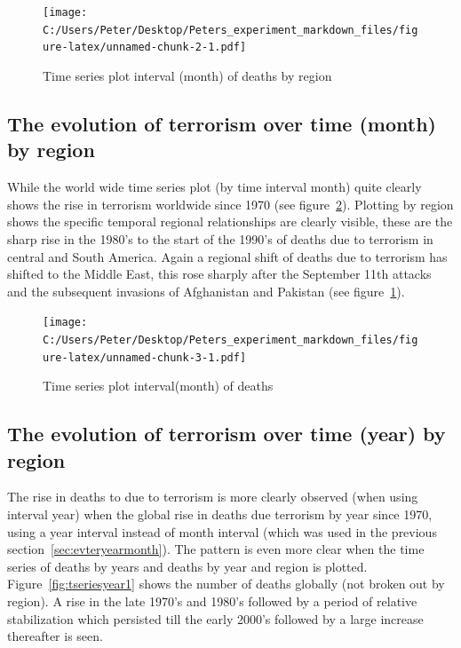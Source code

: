 \begin{figure}[t]
\texttt{[image: C:/Users/Peter/Desktop/Peters\_experiment\_markdown\_files/figure-latex/unnamed-chunk-2-1.pdf]}
\caption{Time series plot interval (month) of deaths by region}
\label{fig:tseriesmonthregion1}
\centering
\end{figure}

\subsection{The evolution of terrorism over time (month) by
region}

While the world wide time series plot (by time interval month) quite clearly shows the rise in terrorism worldwide since 1970 (see figure~\ref{fig:tseriesmonth1}). Plotting by region shows the specific temporal regional relationships are clearly visible, these are the sharp rise in the 1980's to the start of the 1990's of deaths due to terrorism in central and South America. Again a regional shift of deaths due to terrorism has shifted to the Middle East, this rose sharply after the September 11th attacks and the subsequent invasions of Afghanistan and Pakistan (see figure~\ref{fig:tseriesmonthregion1}).

\begin{figure}[t]
\texttt{[image: C:/Users/Peter/Desktop/Peters\_experiment\_markdown\_files/figure-latex/unnamed-chunk-3-1.pdf]}
\caption{Time series plot interval(month) of deaths}
\label{fig:tseriesmonth1}
\centering
\end{figure}

\subsection{The evolution of terrorism over time (year) by
region}

The rise in deaths to due to terrorism is more clearly observed (when using interval year) when the global rise in deaths due terrorism by year since 1970, using a year interval instead of month interval (which was used in the previous section~\ref{sec:evteryearmonth}). The pattern is even more clear when the time series of deaths by years and deaths by year and region is plotted. Figure~\ref{fig:tseriesyear1} shows the number of deaths globally (not broken out by region). A rise in the late 1970's and 1980's followed by a period of relative stabilization  which persisted till the early 2000's followed by a large increase thereafter is seen.

